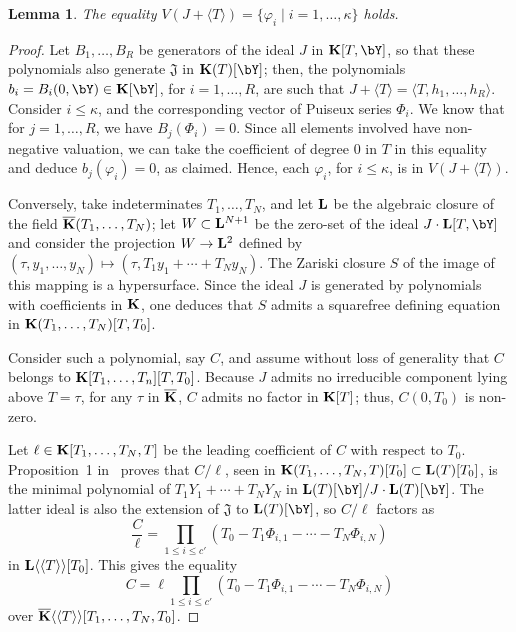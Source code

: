 \documentclass[12pt]{article}
\newtheorem{lemma}[definition]{Lemma}
\begin{document}
\begin{lemma}\label{lemma:Z1}
  The equality $V(J +\langle T \rangle)=\{\varphi_i \mid i=1,\dots,\kappa\}$ holds.
\end{lemma}
\begin{proof}
  Let $B_1,\dots,B_R$ be generators of the ideal $J$ in
  $\KK[T,\bY]$, so that these polynomials also generate
  $\mathfrak{J}$ in $\KK(T)[\bY]$; then, the polynomials
  $b_i=B_i(0,\bY) \in \KK[\bY]$, for $i=1,\dots,R$, are such that
  $J+\langle T\rangle = \langle T,h_1,\dots,h_R \rangle$.  Consider
  $i \le \kappa$, and the corresponding vector of Puiseux series
  $\Phi_i$. We know that for $j=1,\dots,R$, we have $B_j(\Phi_i)=0$.
  Since all elements involved have non-negative valuation, we can take
  the coefficient of degree $0$ in $T$ in this equality and deduce
  $b_j(\varphi_i)=0$, as claimed. Hence, each $\varphi_i$, for $i \le
  \kappa$, is in $V(J + \langle T \rangle)$.

  Conversely, take indeterminates $T_1,\dots,T_N$, and let $\mathbf{L}$ be
  the algebraic closure of the field $\overline{\mathbf{K}}(T_1,\dots,T_N)$; let
  $W\subset{\ensuremath{\mathbf{L}}}{}^{N+1}$ be the zero-set of the ideal $J\cdot
  \LL[T,\bY]$ and consider the projection $W \to {\ensuremath{\mathbf{L}}}{}^2$ defined
  by $(\tau,y_1,\dots,y_N)\mapsto (\tau,T_1 y_1 + \cdots + T_N y_N)$. The
  Zariski closure $S$ of the image of this mapping is a
  hypersurface. %
  Since
  the ideal $J$ is generated by polynomials with coefficients in $\mathbf{K}$,
  one deduces that $S$ admits a squarefree defining equation in
  $\mathbf{K}(T_1,\dots,T_N)[T,T_0]$.

  Consider such a polynomial, say $C$, and assume without loss of
  generality that $C$ belongs to 
  $\mathbf{K}[T_1,\dots,T_n][T,T_0]$. Because $J$ admits no irreducible
  component lying above $T=\tau$, for any $\tau$ in $\overline{\mathbf{K}}$, $C$
  admits no factor in $\mathbf{K}[T]$; thus, $C(0,T_0)$ is non-zero.

  Let $\ell \in \mathbf{K}[T_1,\dots,T_N,T]$ be the leading coefficient of
  $C$ with respect to $T_0$. Proposition~1 in~\cite{Schost03} proves
  that $C/\ell$, seen in $\mathbf{K}(T_1,\dots,T_N,T)[T_0] \subset
  \mathbf{L}(T)[T_0]$, is the minimal polynomial of $T_1 Y_1 + \cdots +
  T_N Y_N$ in $\LL(T)[\bY]/J\cdot \LL(T)[\bY]$. The latter ideal
  is also the extension of $\mathfrak{J}$ to $\LL(T)[\bY]$, 
  so $C/\ell$ factors as
  $$\frac C\ell = \prod_{1\le i \le c'}(T_0-T_1 \Phi_{i,1} - \cdots - T_N \Phi_{i,N})$$
  in $\mathbf{L}\langle\langle T \rangle\rangle[T_0]$.
  This gives the equality 
  $$C =\ell \prod_{1\le i \le  c'}(T_0-T_1 \Phi_{i,1} - \cdots - T_N
  \Phi_{i,N})$$ over $\overline{\mathbf{K}}\langle\langle T \rangle\rangle[T_1,\dots,T_N,T_0]$. 


\end{proof}
\end{document}
